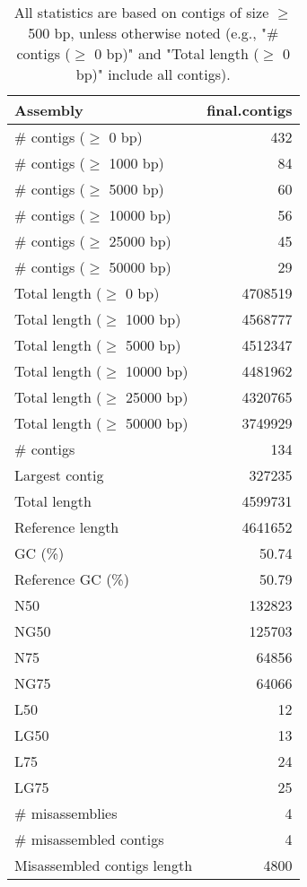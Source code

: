 \documentclass[12pt,a4paper]{article}
\begin{document}
\begin{table}[ht]
\begin{center}
\caption{All statistics are based on contigs of size $\geq$ 500 bp, unless otherwise noted (e.g., "\# contigs ($\geq$ 0 bp)" and "Total length ($\geq$ 0 bp)" include all contigs).}
\begin{tabular}{|l*{1}{|r}|}
\hline
Assembly & final.contigs \\ \hline
\# contigs ($\geq$ 0 bp) & 432 \\ \hline
\# contigs ($\geq$ 1000 bp) & 84 \\ \hline
\# contigs ($\geq$ 5000 bp) & 60 \\ \hline
\# contigs ($\geq$ 10000 bp) & 56 \\ \hline
\# contigs ($\geq$ 25000 bp) & 45 \\ \hline
\# contigs ($\geq$ 50000 bp) & 29 \\ \hline
Total length ($\geq$ 0 bp) & 4708519 \\ \hline
Total length ($\geq$ 1000 bp) & 4568777 \\ \hline
Total length ($\geq$ 5000 bp) & 4512347 \\ \hline
Total length ($\geq$ 10000 bp) & 4481962 \\ \hline
Total length ($\geq$ 25000 bp) & 4320765 \\ \hline
Total length ($\geq$ 50000 bp) & 3749929 \\ \hline
\# contigs & 134 \\ \hline
Largest contig & 327235 \\ \hline
Total length & 4599731 \\ \hline
Reference length & 4641652 \\ \hline
GC (\%) & 50.74 \\ \hline
Reference GC (\%) & 50.79 \\ \hline
N50 & 132823 \\ \hline
NG50 & 125703 \\ \hline
N75 & 64856 \\ \hline
NG75 & 64066 \\ \hline
L50 & 12 \\ \hline
LG50 & 13 \\ \hline
L75 & 24 \\ \hline
LG75 & 25 \\ \hline
\# misassemblies & 4 \\ \hline
\# misassembled contigs & 4 \\ \hline
Misassembled contigs length & 4800 \\ \hline

\end{tabular}
\end{center}
\end{table}
\end{document}
